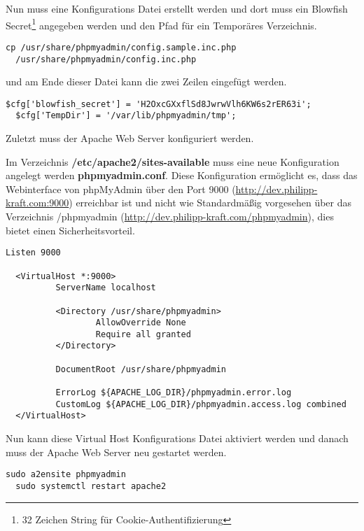 Nun muss eine Konfigurations Datei erstellt werden und dort muss ein Blowfish
Secret\footnote{32 Zeichen String für Cookie-Authentifizierung} angegeben werden und den Pfad für ein Temporäres Verzeichnis.

\begin{lstlisting}[caption={phpMyAdmin Konfigurationsdatei erstellen}, captionpos=b]
  cp /usr/share/phpmyadmin/config.sample.inc.php  
  /usr/share/phpmyadmin/config.inc.php
\end{lstlisting}

und am Ende dieser Datei kann die zwei Zeilen eingefügt werden.

\begin{lstlisting}[caption={phpMyAdmin Blowfish Secret und TempDir}, captionpos=b]
  $cfg['blowfish_secret'] = 'H2OxcGXxflSd8JwrwVlh6KW6s2rER63i'; 
  $cfg['TempDir'] = '/var/lib/phpmyadmin/tmp';
\end{lstlisting}

Zuletzt muss der Apache Web Server konfiguriert werden.

Im Verzeichnis \textbf{/etc/apache2/sites-available} muss eine neue
Konfiguration angelegt werden \textbf{phpmyadmin.conf}. Diese Konfiguration
ermöglicht es, dass das Webinterface von phpMyAdmin über den Port 9000 (\url{http://dev.philipp-kraft.com:9000})
erreichbar ist und nicht wie Standardmäßig vorgesehen über das Verzeichnis
/phpmyadmin (\url{http://dev.philipp-kraft.com/phpmyadmin}), dies bietet einen Sicherheitsvorteil.

\begin{lstlisting}[caption={phpmyadmin.conf}, captionpos=b]
  Listen 9000

  <VirtualHost *:9000>
          ServerName localhost
  
          <Directory /usr/share/phpmyadmin>
                  AllowOverride None
                  Require all granted
          </Directory>
  
          DocumentRoot /usr/share/phpmyadmin
  
          ErrorLog ${APACHE_LOG_DIR}/phpmyadmin.error.log
          CustomLog ${APACHE_LOG_DIR}/phpmyadmin.access.log combined
  </VirtualHost>
\end{lstlisting}

Nun kann diese Virtual Host Konfigurations Datei aktiviert werden und danach
muss der Apache Web Server neu gestartet werden.

\begin{lstlisting}[caption={Virtual Host aktivieren}, captionpos=b]
  sudo a2ensite phpmyadmin
  sudo systemctl restart apache2
\end{lstlisting}